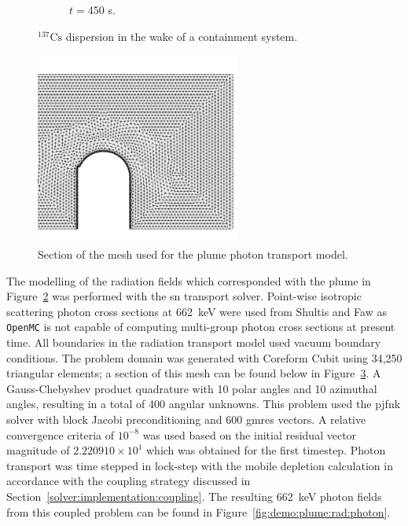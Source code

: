 \begin{figure}[H]
\begin{subfigure}[b]{0.68\textwidth}
        \caption{$t = 450$ s.}
        \label{fig:demo:plume:flow:cs:450}
    \end{subfigure}
    \caption{$\mathrm{^{137}Cs}$ dispersion in the wake of a containment system.}
    \label{fig:demo:plume:flow:cs}
\end{figure}

\begin{figure}[H]
    \centering
    \includegraphics[width=0.6\textwidth]{images/demos/plume/rad_mesh.png}
    \caption{Section of the mesh used for the plume photon transport model.}
    \label{fig:demo:plume:rad:mesh}
\end{figure}

The modelling of the radiation fields which corresponded with the plume in Figure~\ref{fig:demo:plume:flow:cs} was performed with the \acrshort{sn} transport solver. Point-wise isotropic scattering photon cross sections at 662~keV were used from Shultis and Faw \cite{radiation_shielding} as \texttt{OpenMC} is not capable of computing multi-group photon cross sections at present time. All boundaries in the radiation transport model used vacuum boundary conditions. The problem domain was generated with Coreform Cubit using 34,250 triangular elements; a section of this mesh can be found below in Figure~\ref{fig:demo:plume:rad:mesh}. A Gauss-Chebyshev product quadrature with 10 polar angles and 10 azimuthal angles, resulting in a total of 400 angular unknowns. This problem used the \acrshort{pjfnk} solver with block Jacobi preconditioning and 600 \acrshort{gmres} vectors. A relative convergence criteria of $10^{-8}$ was used based on the initial residual vector magnitude of $2.220910\times 10^{1}$ which was obtained for the first timestep. Photon transport was time stepped in lock-step with the mobile depletion calculation in accordance with the coupling strategy discussed in Section~\ref{solver:implementation:coupling}. The resulting 662~keV photon fields from this coupled problem can be found in Figure~\ref{fig:demo:plume:rad:photon}.

